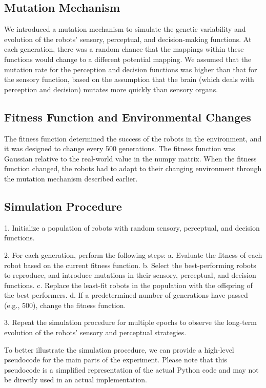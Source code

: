 \documentclass{article}[10pt]
\begin{document}
\subsection{Mutation Mechanism}

We introduced a mutation mechanism to simulate the genetic variability and evolution of the robots' sensory, perceptual, and decision-making functions. At each generation, there was a random chance that the mappings within these functions would change to a different potential mapping. We assumed that the mutation rate for the perception and decision functions was higher than that for the sensory function, based on the assumption that the brain (which deals with perception and decision) mutates more quickly than sensory organs.

\subsection{Fitness Function and Environmental Changes}

The fitness function determined the success of the robots in the environment, and it was designed to change every 500 generations. The fitness function was Gaussian relative to the real-world value in the numpy matrix. When the fitness function changed, the robots had to adapt to their changing environment through the mutation mechanism described earlier.

\subsection{Simulation Procedure}

1. Initialize a population of robots with random sensory, perceptual, and decision functions.

2. For each generation, perform the following steps:
  a. Evaluate the fitness of each robot based on the current fitness function.
  b. Select the best-performing robots to reproduce, and introduce mutations in their sensory, perceptual, and decision functions.
  c. Replace the least-fit robots in the population with the offspring of the best performers.
  d. If a predetermined number of generations have passed (e.g., 500), change the fitness function.

3. Repeat the simulation procedure for multiple epochs to observe the long-term evolution of the robots' sensory and perceptual strategies.

To better illustrate the simulation procedure, we can provide a high-level pseudocode for the main parts of the experiment. Please note that this pseudocode is a simplified representation of the actual Python code and may not be directly used in an actual implementation.
\end{document}

